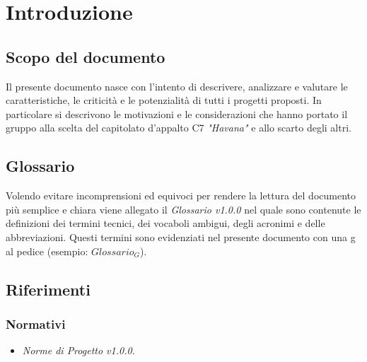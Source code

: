 \section{Introduzione}
	\subsection{Scopo del documento}
	Il presente documento nasce con l'intento di descrivere, analizzare e valutare le caratteristiche, le criticità e le potenzialità di tutti i progetti proposti. In particolare si descrivono le motivazioni e le considerazioni che hanno portato il gruppo alla scelta del capitolato d'appalto C7 \emph{"Havana"} e allo scarto degli altri.
	\subsection{Glossario}
	Volendo evitare incomprensioni  ed equivoci per rendere la lettura del documento più semplice e chiara viene allegato il \emph{Glossario v1.0.0} nel quale sono contenute le definizioni dei termini tecnici, dei vocaboli ambigui, degli acronimi e delle abbreviazioni. Questi termini sono evidenziati nel presente documento con una g al pedice (esempio: $Glossario_{G}$).  
	\subsection{Riferimenti}
		\subsubsection{Normativi}
		\begin{itemize}
			\item \emph{Norme di Progetto v1.0.0.}
		\end{itemize}
		

